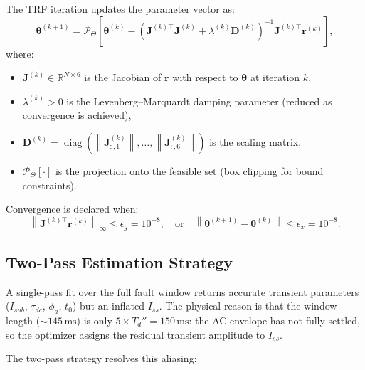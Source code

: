 \documentclass[12pt, a4paper]{article}
\theoremstyle{definition}
\theoremstyle{plain}
\newcommand{\vect}[1]{\bm{#1}}
\newcommand{\mat}[1]{\mathbf{#1}}
\newcommand{\norm}[1]{\left\|#1\right\|}
\newcommand{\diag}{\operatorname{diag}}
\begin{document}
The TRF iteration updates the parameter vector as:
\begin{equation}
  \vect{\theta}^{(k+1)} = \mathcal{P}_\Theta\!\left[
    \vect{\theta}^{(k)} - \left(\mat{J}^{(k)\top}\mat{J}^{(k)} +
    \lambda^{(k)}\mat{D}^{(k)}\right)^{-1} \mat{J}^{(k)\top} \vect{r}^{(k)}
  \right],
  \label{eq:lm_update}
\end{equation}
where:
\begin{itemize}
  \item $\mat{J}^{(k)} \in \mathbb{R}^{N \times 6}$ is the Jacobian of
        $\vect{r}$ with respect to $\vect{\theta}$ at iteration $k$,
  \item $\lambda^{(k)} > 0$ is the Levenberg--Marquardt damping parameter
        (reduced as convergence is achieved),
  \item $\mat{D}^{(k)} = \diag\!\left(\norm{\mat{J}^{(k)}_{:,1}},\ldots,
        \norm{\mat{J}^{(k)}_{:,6}}\right)$ is the scaling matrix,
  \item $\mathcal{P}_\Theta[\cdot]$ is the projection onto the feasible set
        (box clipping for bound constraints).
\end{itemize}

Convergence is declared when:
\begin{equation}
  \norm{\mat{J}^{(k)\top}\vect{r}^{(k)}}_\infty \leq \epsilon_g = 10^{-8},
  \quad\text{or}\quad
  \norm{\vect{\theta}^{(k+1)} - \vect{\theta}^{(k)}} \leq \epsilon_x = 10^{-8}.
  \label{eq:convergence}
\end{equation}

\subsection{Two-Pass Estimation Strategy}
\label{sec:estimation:twopass}

A single-pass fit over the full fault window returns accurate transient
parameters ($I_{sub}$, $\tau_{dc}$, $\phi_a$, $t_0$) but an inflated
$I_{ss}$.  The physical reason is that the window length ($\sim 145\,\text{ms}$) is
only $5\times T_d'' = 150\,\text{ms}$: the AC envelope has not fully settled, so
the optimizer assigns the residual transient amplitude to $I_{ss}$.

The two-pass strategy resolves this aliasing:
\end{document}
